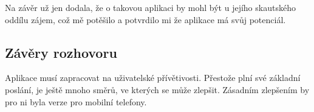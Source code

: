 \documentclass[a4paper, 12pt]{article} %
\begin{document}
Na závěr už jen dodala, že o takovou aplikaci by mohl být u jejího skautského oddílu zájem, což mě potěšilo a potvrdilo mi že aplikace má svůj potenciál.

\subsection{Závěry rozhovoru}
Aplikace musí zapracovat na uživatelské přívětivosti. Přestože plní své základní poslání, je ještě mnoho směrů, ve kterých se může zlepšit. Zásadním zlepšením by pro ni byla verze pro mobilní telefony. 
\end{document}
